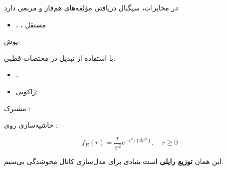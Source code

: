 

در مخابرات، سیگنال دریافتی مؤلفه‌های هم‌فاز  و مربعی  دارد:

\begin{itemize}
\tightlist
\item
  ، ، مستقل
\end{itemize}

پوش: 

با استفاده از تبدیل  در مختصات قطبی:

\begin{itemize}
\tightlist
\item
  ، 
\item
  ژاکوبی: 
\end{itemize}

 مشترک :\PSbr{}

حاشیه‌سازی روی \lr{\ensuremath{\theta} \ensuremath{\in} [0, 2\ensuremath{\pi})}:

\[f_R(r) = \frac{r}{\sigma^2} e^{-r^2/(2\sigma^2)}, \quad r \geq 0\]

این همان \textbf{توزیع رایلی} است  بنیادی برای مدل‌سازی کانال محوشدگی بی‌سیم.


